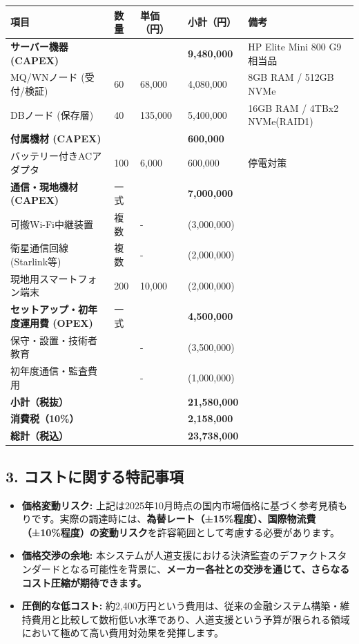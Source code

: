 \documentclass[
  a4paper,
  ja=standard,
  xelatex]{bxjsarticle}
\begin{document}
\begin{longtable}[]{@{}lllll@{}}
\toprule\noalign{}
項目 & 数量 & 単価（円） & 小計（円） & 備考 \\
\midrule\noalign{}
\endhead
\bottomrule\noalign{}
\endlastfoot
\textbf{サーバー機器 (CAPEX)} & & & \textbf{9,480,000} & HP Elite Mini
800 G9相当品 \\
MQ/WNノード (受付/検証) & 60 & 68,000 & 4,080,000 & 8GB RAM / 512GB
NVMe \\
DBノード (保存層) & 40 & 135,000 & 5,400,000 & 16GB RAM / 4TBx2
NVMe(RAID1) \\
\textbf{付属機材 (CAPEX)} & & & \textbf{600,000} & \\
バッテリー付きACアダプタ & 100 & 6,000 & 600,000 & 停電対策 \\
\textbf{通信・現地機材 (CAPEX)} & 一式 & & \textbf{7,000,000} & \\
可搬Wi-Fi中継装置 & 複数 & - & (3,000,000) & \\
衛星通信回線 (Starlink等) & 複数 & - & (2,000,000) & \\
現地用スマートフォン端末 & 200 & 10,000 & (2,000,000) & \\
\textbf{セットアップ・初年度運用費 (OPEX)} & 一式 & & \textbf{4,500,000}
& \\
保守・設置・技術者教育 & & - & (3,500,000) & \\
初年度通信・監査費用 & & - & (1,000,000) & \\
\textbf{小計（税抜）} & & & \textbf{21,580,000} & \\
\textbf{消費税（10\%）} & & & \textbf{2,158,000} & \\
\textbf{総計（税込）} & & & \textbf{23,738,000} & \\
\end{longtable}

\subsection{\texorpdfstring{\textbf{3.
コストに関する特記事項}}{3. コストに関する特記事項}}\label{ux30b3ux30b9ux30c8ux306bux95a2ux3059ux308bux7279ux8a18ux4e8bux9805}

\begin{itemize}
\item
  \textbf{価格変動リスク:}
  上記は2025年10月時点の国内市場価格に基づく参考見積もりです。実際の調達時には、\textbf{為替レート（±15\%程度）、国際物流費（±10\%程度）の変動リスク}を許容範囲として考慮する必要があります。
\item
  \textbf{価格交渉の余地:}
  本システムが人道支援における決済監査のデファクトスタンダードとなる可能性を背景に、\textbf{メーカー各社との交渉を通じて、さらなるコスト圧縮が期待できます。}
\item
  \textbf{圧倒的な低コスト:}
  約2,400万円という費用は、従来の金融システム構築・維持費用と比較して数桁低い水準であり、人道支援という予算が限られる領域において極めて高い費用対効果を発揮します。
\end{itemize}
\end{document}
